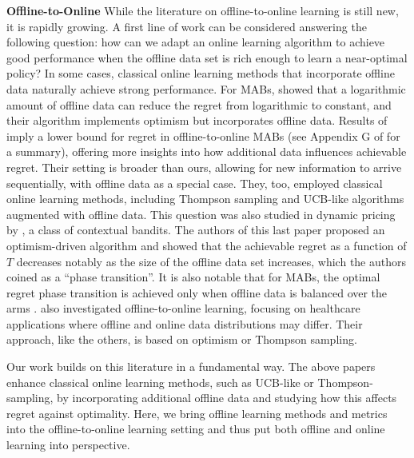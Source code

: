 \textbf{Offline-to-Online} 
While the literature on offline-to-online learning is still new, it is rapidly growing. A first line of work can be considered answering the following question: how can we adapt an online learning algorithm to achieve good performance when the offline data set is rich enough to learn a near-optimal policy? In some cases, classical online learning methods that incorporate offline data naturally achieve strong performance. For MABs, \cite{MABwithHistory} showed that a logarithmic amount of offline data can reduce the regret from logarithmic to constant, and their algorithm implements optimism but incorporates offline data. Results of \cite{gur2020adaptive} imply a lower bound for regret in offline-to-online MABs (see Appendix G of \citealt{bu2021onlinepricingofflinedata} for a summary), offering more insights into how additional data influences achievable regret. Their setting is broader than ours, allowing for new information to arrive sequentially, with offline data as a special case. They, too, employed classical online learning methods, including Thompson sampling and UCB-like algorithms augmented with offline data.
This question was also studied in dynamic pricing by \cite{bu2021onlinepricingofflinedata},  a class of contextual bandits. The authors of this last paper proposed an optimism-driven algorithm and showed that the achievable regret as a function of $T$ decreases notably as the size of the offline data set increases, which the authors coined as a ``phase transition''. It is also notable that for MABs, the optimal regret phase transition is achieved only when offline data is balanced over the arms \citep{bu2021onlinepricingofflinedata}. \cite{chen2022data} also investigated offline-to-online learning, focusing on healthcare applications where offline and online data distributions may differ. Their approach, like the others, is based on optimism or Thompson sampling.

Our work builds on this literature in a fundamental way. The above papers enhance classical online learning methods, such as UCB-like or Thompson-sampling, by incorporating additional offline data and studying how this affects regret against optimality. Here, we bring offline learning methods and metrics into the offline-to-online learning setting and thus put both offline and online learning into perspective. 

